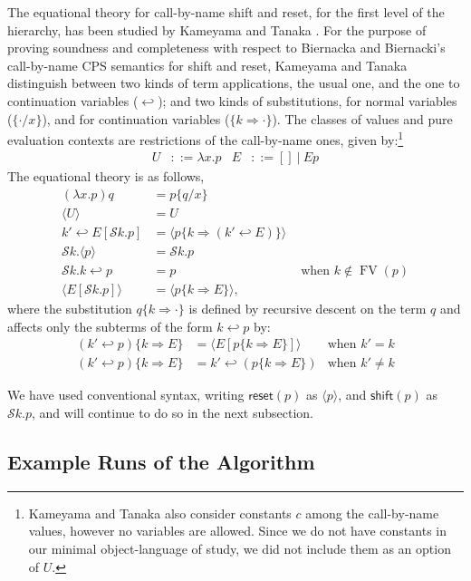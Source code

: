 \documentclass{eptcs}
\newcommand{\reset}[1]{\mathsf{reset}{(#1)}}
\newcommand{\shift}[1]{\mathsf{shift}{(#1)}}
\DeclareMathOperator{\FV}{FV}
\newcommand{\ureset}[1]{\langle{#1}\rangle}
\newcommand{\ushift}[2]{\mathcal{S}{#1}.{#2}}
\theoremstyle{definition}
\theoremstyle{plain}
\theoremstyle{remark}
\begin{document}
The equational theory for call-by-name shift and reset, for the first level of the hierarchy, has been studied by Kameyama and Tanaka \cite{KameyamaTanaka2010}. For the purpose of proving soundness and completeness with respect to Biernacka and Biernacki's \cite{BiernackaB2009} call-by-name CPS semantics for shift and reset, Kameyama and Tanaka distinguish between two kinds of term applications, the usual one, and the one to continuation variables ($\hookleftarrow$); and two kinds of substitutions, for normal variables ($\{\cdot/x\}$), and for continuation variables ($\{k\Rightarrow\cdot\}$). The classes of values and pure evaluation contexts are restrictions of the call-by-name ones, given by:\footnote{Kameyama and Tanaka also consider constants $c$ among the call-by-name values, however no variables are allowed. Since we do not have constants in our minimal object-language of study, we did not include them as an option of $U$.}
\begin{align*}
  U &::= \lambda x.p &
  E &::= [] ~|~ E p
\end{align*}
The equational theory is as follows,
\begin{align}
(\lambda x.p) q &= p \{q/x\}\\
\ureset{U} &= U\\
k'\hookleftarrow E[\ushift{k}{p}] &= \ureset{p \{k\Rightarrow (k'\hookleftarrow E)\}}\\
\ushift{k}{\ureset{p}} &= \ushift{k}{p}\\
\ushift{k}{k\hookleftarrow p} &= p&\text{ when }k\notin \FV(p)\\
\ureset{E[\ushift{k}{p}]} &= \ureset{p\{k\Rightarrow E\}},
\end{align}
where the substitution $q \{k\Rightarrow\cdot\}$ is defined by recursive descent on the term $q$ and affects only the subterms of the form $k\hookleftarrow p$ by:
\begin{align*}
(k'\hookleftarrow p)\{k\Rightarrow E\} &= \ureset{E[p\{k\Rightarrow E\}]} &\text{when } k' = k\\
(k'\hookleftarrow p)\{k\Rightarrow E\} &= k'\hookleftarrow (p \{k\Rightarrow E\})&\text{when } k' \neq k
\end{align*}

We have used conventional syntax, writing $\reset{p}$ as $\ureset{p}$, and $\shift{p}$ as $\ushift{k}{p}$, and will continue to do so in the next subsection.

\subsection{Example Runs of the Algorithm}\label{examples}
\end{document}
